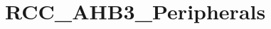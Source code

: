 \hypertarget{group___r_c_c___a_h_b3___peripherals}{\section{R\-C\-C\-\_\-\-A\-H\-B3\-\_\-\-Peripherals}
\label{group___r_c_c___a_h_b3___peripherals}
}
